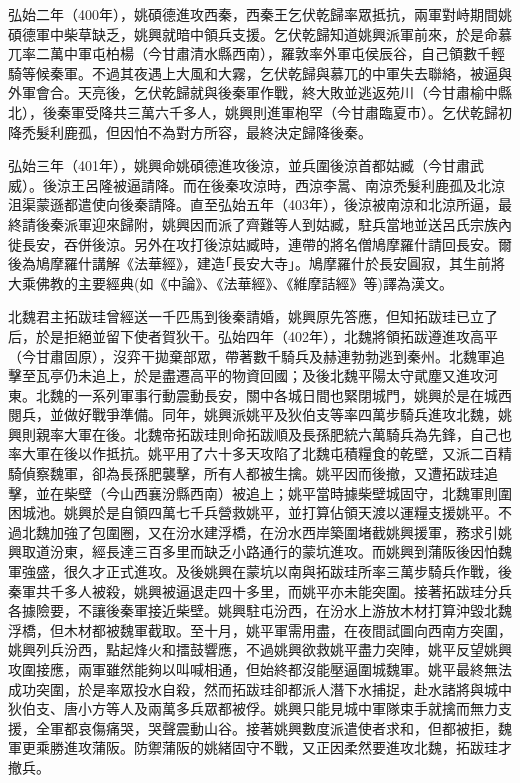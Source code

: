 弘始二年（400年），姚碩德進攻西秦，西秦王乞伏乾歸率眾抵抗，兩軍對峙期間姚碩德軍中柴草缺乏，姚興就暗中領兵支援。乞伏乾歸知道姚興派軍前來，於是命慕兀率二萬中軍屯柏楊（今甘肅清水縣西南），羅敦率外軍屯侯辰谷，自己領數千輕騎等候秦軍。不過其夜遇上大風和大霧，乞伏乾歸與慕兀的中軍失去聯絡，被逼與外軍會合。天亮後，乞伏乾歸就與後秦軍作戰，終大敗並逃返苑川（今甘肅榆中縣北），後秦軍受降共三萬六千多人，姚興則進軍枹罕（今甘肅臨夏市）。乞伏乾歸初降禿髮利鹿孤，但因怕不為對方所容，最終決定歸降後秦。

弘始三年（401年），姚興命姚碩德進攻後涼，並兵圍後涼首都姑臧（今甘肅武威）。後涼王呂隆被逼請降。而在後秦攻涼時，西涼李暠、南涼禿髮利鹿孤及北涼沮渠蒙遜都遣使向後秦請降。直至弘始五年（403年），後涼被南涼和北涼所逼，最終請後秦派軍迎來歸附，姚興因而派了齊難等人到姑臧，駐兵當地並送呂氏宗族內徙長安，吞併後涼。另外在攻打後涼姑臧時，連帶的將名僧鳩摩羅什請回長安。爾後為鳩摩羅什講解《法華經》，建造｢長安大寺｣。鳩摩羅什於長安圓寂，其生前將大乘佛教的主要經典(如《中論》、《法華經》、《維摩詰經》等)譯為漢文。

北魏君主拓跋珪曾經送一千匹馬到後秦請婚，姚興原先答應，但知拓跋珪已立了后，於是拒絕並留下使者賀狄干。弘始四年（402年），北魏將領拓跋遵進攻高平（今甘肅固原），沒弈干拋棄部眾，帶著數千騎兵及赫連勃勃逃到秦州。北魏軍追擊至瓦亭仍未追上，於是盡遷高平的物資回國；及後北魏平陽太守貮塵又進攻河東。北魏的一系列軍事行動震動長安，關中各城日間也緊閉城門，姚興於是在城西閱兵，並做好戰爭準備。同年，姚興派姚平及狄伯支等率四萬步騎兵進攻北魏，姚興則親率大軍在後。北魏帝拓跋珪則命拓跋順及長孫肥統六萬騎兵為先鋒，自己也率大軍在後以作抵抗。姚平用了六十多天攻陷了北魏屯積糧食的乾壁，又派二百精騎偵察魏軍，卻為長孫肥襲擊，所有人都被生擒。姚平因而後撤，又遭拓跋珪追擊，並在柴壁（今山西襄汾縣西南）被追上；姚平當時據柴壁城固守，北魏軍則圍困城池。姚興於是自領四萬七千兵營救姚平，並打算佔領天渡以運糧支援姚平。不過北魏加強了包圍圈，又在汾水建浮橋，在汾水西岸築圍堵截姚興援軍，務求引姚興取道汾東，經長達三百多里而缺乏小路通行的蒙坑進攻。而姚興到蒲阪後因怕魏軍強盛，很久才正式進攻。及後姚興在蒙坑以南與拓跋珪所率三萬步騎兵作戰，後秦軍共千多人被殺，姚興被逼退走四十多里，而姚平亦未能突圍。接著拓跋珪分兵各據險要，不讓後秦軍接近柴壁。姚興駐屯汾西，在汾水上游放木材打算沖毀北魏浮橋，但木材都被魏軍截取。至十月，姚平軍需用盡，在夜間試圖向西南方突圍，姚興列兵汾西，點起烽火和擂鼓響應，不過姚興欲救姚平盡力突陣，姚平反望姚興攻圍接應，兩軍雖然能夠以叫喊相通，但始終都沒能壓逼圍城魏軍。姚平最終無法成功突圍，於是率眾投水自殺，然而拓跋珪卻都派人潛下水捕捉，赴水諸將與城中狄伯支、唐小方等人及兩萬多兵眾都被俘。姚興只能見城中軍隊束手就擒而無力支援，全軍都哀傷痛哭，哭聲震動山谷。接著姚興數度派遣使者求和，但都被拒，魏軍更乘勝進攻蒲阪。防禦蒲阪的姚緒固守不戰，又正因柔然要進攻北魏，拓跋珪才撤兵。

